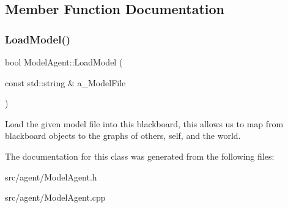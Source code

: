 \subsection{Member Function Documentation}
\mbox{\label{class_model_agent_af75ddec339ede2777221a8fcd91b6044}} 
\subsubsection{\texorpdfstring{Load\+Model()}{LoadModel()}}
{\footnotesize\ttfamily bool Model\+Agent\+::\+Load\+Model (\begin{DoxyParamCaption}\item[{const std\+::string \&}]{a\+\_\+\+Model\+File }\end{DoxyParamCaption})}

Load the given model file into this blackboard, this allows us to map from blackboard objects to the graphs of others, self, and the world. 

The documentation for this class was generated from the following files\+:\begin{DoxyCompactItemize}
\item 
src/agent/Model\+Agent.\+h\item 
src/agent/Model\+Agent.\+cpp\end{DoxyCompactItemize}
